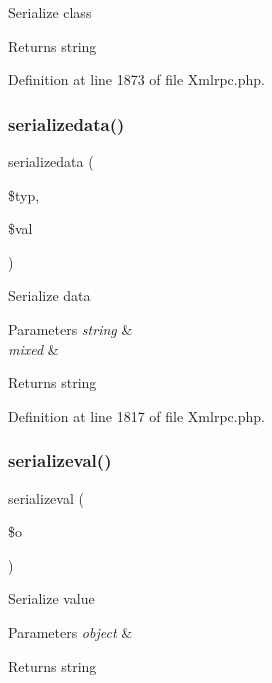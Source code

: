 Serialize class

\begin{DoxyReturn}{Returns}
string 
\end{DoxyReturn}


Definition at line 1873 of file Xmlrpc.\+php.

\mbox{\label{class_x_m_l___r_p_c___values_a7058e00e310218c447d3c9fea0ee0a3d}} 
\subsubsection{\texorpdfstring{serializedata()}{serializedata()}}
{\footnotesize\ttfamily serializedata (\begin{DoxyParamCaption}\item[{}]{\$typ,  }\item[{}]{\$val }\end{DoxyParamCaption})}

Serialize data


\begin{DoxyParams}{Parameters}
{\em string} & \\
\hline
{\em mixed} & \\
\hline
\end{DoxyParams}
\begin{DoxyReturn}{Returns}
string 
\end{DoxyReturn}


Definition at line 1817 of file Xmlrpc.\+php.

\mbox{\label{class_x_m_l___r_p_c___values_a1a4bfc79985c185745d96ebe3a1e5c3d}} 
\subsubsection{\texorpdfstring{serializeval()}{serializeval()}}
{\footnotesize\ttfamily serializeval (\begin{DoxyParamCaption}\item[{}]{\$o }\end{DoxyParamCaption})}

Serialize value


\begin{DoxyParams}{Parameters}
{\em object} & \\
\hline
\end{DoxyParams}
\begin{DoxyReturn}{Returns}
string 
\end{DoxyReturn}


